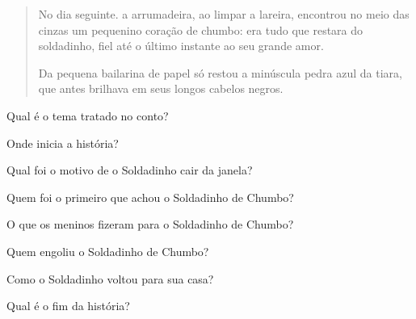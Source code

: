 \begin{escolha}
\begin{escolha}
{\begin{escolha}
\begin{quote}
No dia seguinte. a arrumadeira, ao limpar a lareira, encontrou no meio
das cinzas um pequenino coração de chumbo: era tudo que restara do
soldadinho, fiel até o último instante ao seu grande amor.

Da pequena bailarina de papel só restou a minúscula pedra azul da tiara,
que antes brilhava em seus longos cabelos negros.
\end{quote}


\begin{escolha}
\item Qual é o tema tratado no conto?


\item Onde inicia a história?


\item Qual foi o motivo de o Soldadinho cair da janela?


\item Quem foi o primeiro que achou o Soldadinho de Chumbo?


\item O que os meninos fizeram para o Soldadinho de Chumbo?


\item Quem engoliu o Soldadinho de Chumbo?


\item Como o Soldadinho voltou para sua casa?


\item Qual é o fim da história?

\end{escolha}


\end{escolha}}
\end{escolha}
\end{escolha}
